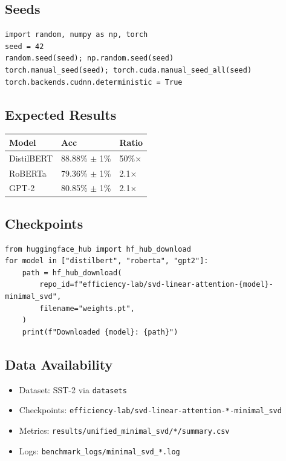 \subsection{Seeds}

\begin{lstlisting}
import random, numpy as np, torch
seed = 42
random.seed(seed); np.random.seed(seed)
torch.manual_seed(seed); torch.cuda.manual_seed_all(seed)
torch.backends.cudnn.deterministic = True
\end{lstlisting}

\subsection{Expected Results}

\begin{table}[H]
\centering
\small
\begin{tabular}{lll}
\toprule
\textbf{Model} & \textbf{Acc} & \textbf{Ratio} \\
\midrule
DistilBERT & 88.88\% $\pm$ 1\% & 50\%$\times$ \\
RoBERTa & 79.36\% $\pm$ 1\% & 2.1$\times$ \\
GPT-2 & 80.85\% $\pm$ 1\% & 2.1$\times$ \\
\bottomrule
\end{tabular}
\end{table}

\subsection{Checkpoints}

\begin{lstlisting}
from huggingface_hub import hf_hub_download
for model in ["distilbert", "roberta", "gpt2"]:
    path = hf_hub_download(
        repo_id=f"efficiency-lab/svd-linear-attention-{model}-minimal_svd",
        filename="weights.pt",
    )
    print(f"Downloaded {model}: {path}")
\end{lstlisting}

\subsection{Data Availability}

\begin{itemize}
\item Dataset: SST-2 via \texttt{datasets}
\item Checkpoints: \texttt{efficiency-lab/svd-linear-attention-*-minimal\_svd}
\item Metrics: \texttt{results/unified\_minimal\_svd/*/summary.csv}
\item Logs: \texttt{benchmark\_logs/minimal\_svd\_*.log}

\end{itemize}
